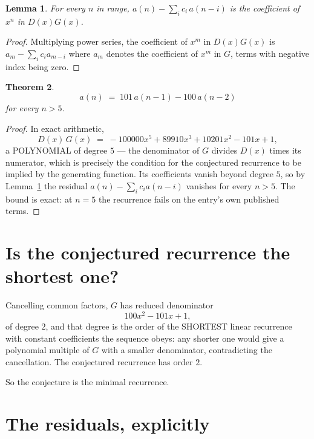 \documentclass[11pt,a4paper]{article}
\theoremstyle{plain}
\newtheorem{theorem}{Theorem}
\newtheorem{lemma}[theorem]{Lemma}
\theoremstyle{definition}
\begin{document}
\begin{lemma}\label{lem:key}
For every $n$ in range, $a(n)-\sum_i c_i\,a(n-i)$ is the coefficient of $x^{n}$ in
$D(x)G(x)$.
\end{lemma}

\begin{proof}
Multiplying power series, the coefficient of $x^{m}$ in $D(x)G(x)$ is
$a_m-\sum_i c_i a_{m-i}$ where $a_m$ denotes the coefficient of $x^{m}$ in $G$, terms with
negative index being zero.
\end{proof}

\begin{theorem}
\[
a(n)\;=\;101\,a(n-1) - 100\,a(n-2)
\]
for every $n>5$.
\end{theorem}

\begin{proof}
In exact arithmetic,
\[
D(x)\,G(x)\;=\;- 100000 x^{5} + 89910 x^{3} + 10201 x^{2} - 101 x + 1,
\]
a POLYNOMIAL of degree $5$ --- the denominator of $G$ divides $D(x)$ times its numerator,
which is precisely the condition for the conjectured recurrence to be implied by the
generating function. Its coefficients vanish beyond degree $5$, so by
Lemma~\ref{lem:key} the residual $a(n)-\sum_ic_ia(n-i)$ vanishes for every
$n>5$. The bound is exact: at $n=5$ the recurrence fails on the entry's own published terms.
\end{proof}

\section{Is the conjectured recurrence the shortest one?}

Cancelling common factors, $G$ has reduced denominator
\[
100 x^{2} - 101 x + 1,
\]
of degree $2$, and that degree is the order of the SHORTEST linear recurrence with
constant coefficients the sequence obeys: any shorter one would give a polynomial multiple of
$G$ with a smaller denominator, contradicting the cancellation. The conjectured recurrence has
order $2$.

So the conjecture is the minimal recurrence.

\section{The residuals, explicitly}
\end{document}
